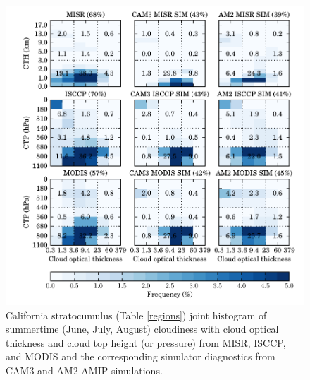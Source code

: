 \begin{figure}
    \centering
    \includegraphics{../graphics/hist2d_cmip3amip_california.pdf}
    \caption[California stratocumulus joint histogram of summertime cloudiness with cloud optical thickness and cloud top height from MISR, ISCCP, and MODIS and the corresponding simulator diagnostics from CAM3 and AM2 AMIP simulations.]{California stratocumulus (Table \ref{regions}) joint histogram of summertime (June, July, August) cloudiness with cloud optical thickness and cloud top height (or pressure) from MISR, ISCCP, and MODIS and the corresponding simulator diagnostics from CAM3 and AM2 AMIP simulations.}
    \label{hist2d_cmip3amip_california}
\end{figure}


